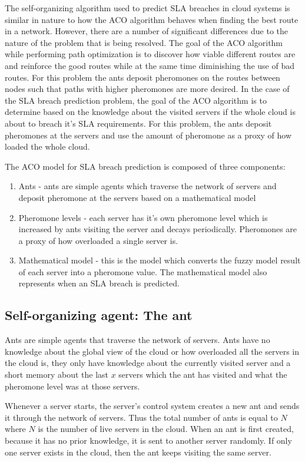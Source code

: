 The self-organizing algorithm used to predict SLA breaches in cloud systems is similar in nature to how the ACO algorithm behaves when finding the best route in a network. However, there are a number of significant differences due to the nature of the problem that is being resolved. The goal of the ACO algorithm while performing path optimization is to discover how viable different routes are and reinforce the good routes while at the same time diminishing the use of bad routes. For this problem the ants deposit pheromones on the routes between nodes such that paths with higher pheromones are more desired. In the case of the SLA breach prediction problem, the goal of the ACO algorithm is to determine based on the knowledge about the visited servers if the whole cloud is about to breach it's SLA requirements. For this problem, the ants deposit pheromones at the servers and use the amount of pheromone as a proxy of how loaded the whole cloud.

The ACO model for SLA breach prediction is composed of three components:

\begin{enumerate}
	\item Ants - ants are simple agents which traverse the network of servers and deposit pheromone at the servers based on a mathematical model
	\item Pheromone levels - each server has it's own pheromone level which is increased by ants visiting the server and decays periodically. Pheromones are a proxy of how overloaded a single server is.
	\item Mathematical model - this is the model which converts the fuzzy model result of each server into a pheromone value. The mathematical model also represents when an SLA breach is predicted.
\end{enumerate}

\subsection{Self-organizing agent: The ant}

Ants are simple agents that traverse the network of servers. Ants have no knowledge about the global view of the cloud or how overloaded all the servers in the cloud is, they only have knowledge about the currently visited server and a short memory about the last $x$ servers which the ant has visited and what the pheromone level was at those servers.

Whenever a server starts, the server's control system creates a new ant and sends it through the network of servers. Thus the total number of ants is equal to $N$ where $N$ is the number of live servers in the cloud. When an ant is first created, because it has no prior knowledge, it is sent to another server randomly. If only one server exists in the cloud, then the ant keeps visiting the same server.

